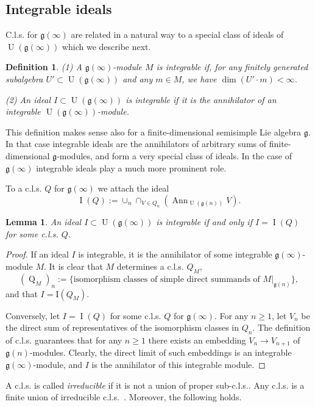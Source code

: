 \documentclass{emsprocart}
\newtheorem{lemma}[theorem]{Lemma}
\newtheorem{definition}[theorem]{Definition}
\begin{document}
\subsection{Integrable ideals}
C.l.s. for $\mathfrak g(\infty)$ are related in a natural way to a special class of ideals of $\operatorname{U}(\mathfrak g(\infty))$ which we describe next. %
\begin{definition}(1) A $\mathfrak g(\infty)$-module
$M$ is {\it integrable} if, for any finitely generated subalgebra
$U'\subset\operatorname{U}(\mathfrak g(\infty))$ and any $m\in M$, we have
$\dim(U'\cdot m)<\infty$.

(2) An ideal $I\subset\operatorname{U}(\mathfrak g(\infty))$ is {\it integrable} if it is the annihilator of an integrable $\operatorname{U}(\mathfrak g(\infty))$-module.\end{definition}
This definition makes sense also for a finite-dimensional semisimple Lie algebra $\mathfrak g$. In that case integrable ideals are the annihilators of  arbitrary sums of finite-dimensional $\mathfrak g$-modules, and form a very special class of ideals. In the case of $\mathfrak g(\infty)$ integrable ideals play a much more prominent role.

To a c.l.s. $Q$ for $\mathfrak g(\infty)$ we attach the ideal
$$\operatorname{I}(Q):=\cup_n\cap_{V\in Q_n}(\operatorname{Ann}_{\operatorname{U}(\mathfrak g(n))}V).$$


\begin{lemma} An ideal $I\subset\operatorname{U}(\mathfrak g(\infty))$ is integrable if and only if $I=\operatorname{I}(Q)$ for some c.l.s. $Q$.\end{lemma}
\begin{proof} If an ideal $I$ is integrable, it is the annihilator of some integrable $\mathfrak g(\infty)$-module $M$. It is clear that $M$ determines a c.l.s. $Q_M$,
$$(\operatorname{Q}_M)_n:=\{\mbox{isomorphism~classes~of~simple~direct~summands~of~}M|_{\mathfrak{g}(n)}\},$$
and that $I=\mathrm{I}(Q_M)$.

Conversely, let $I=\operatorname{I}(Q)$ for some c.l.s. $Q$ for $\mathfrak g(\infty)$. For any $n\ge1$, let $V_n$ be the direct sum of representatives of the isomorphism classes in $Q_n$. The definition of c.l.s. guarantees that for any $n\ge1$ there exists an embedding $V_n\to V_{n+1}$ of $\mathfrak g(n)$-modules. Clearly, the direct limit of such embeddings is an integrable $\mathfrak g(\infty)$-module, and $I$ is the annihilator of this integrable module.
\end{proof}
A c.l.s. is called {\it irreducible} if it is not a union of proper sub-c.l.s.. Any c.l.s. is a finite union of irreducible c.l.s.~\cite{Zh1, Zh3}. Moreover, the following holds.
\end{document}

